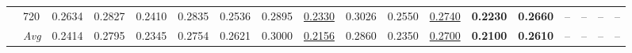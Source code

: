 \begin{tabular}{llcccccccccccccccc}
               & 720        &         0.2634 &         0.2827 &         0.2410 &         0.2835 &         0.2536 &         0.2895 & \underline{0.2330} &         0.3026 &         0.2550 & \underline{0.2740} & \textbf{0.2230} & \textbf{0.2660} &             -- &             -- &             -- &             -- \\
               & \textit{Avg} &         0.2414 &         0.2795 &         0.2345 &         0.2754 &         0.2621 &         0.3000 & \underline{0.2156} &         0.2860 &         0.2350 & \underline{0.2700} & \textbf{0.2100} & \textbf{0.2610} &             -- &             -- &             -- &             -- \\
\bottomrule
\end{tabular}
